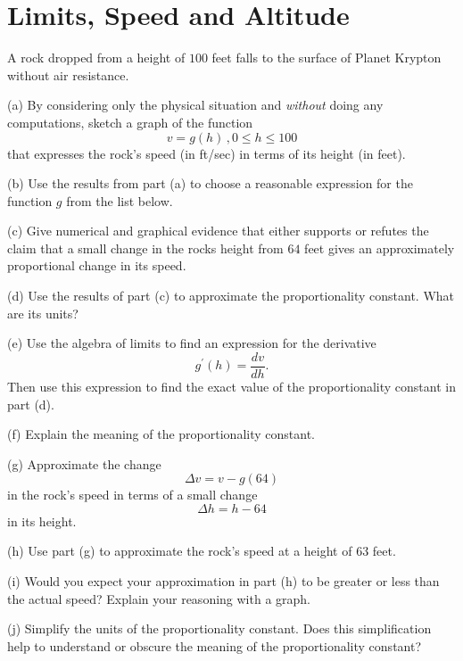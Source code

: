 \documentclass{ximera}
\begin{document}
\section{Limits, Speed and Altitude}
\begin{question}  \label{Ex:defdftd}
A rock dropped from a height of $100$ feet falls to the surface of Planet Krypton without air resistance.

(a) By considering only the physical situation and \emph{without} doing any computations, sketch a graph of the function
\[
    v =g(h) \, , 0\leq h \leq 100
\]
that expresses the rock's speed (in ft/sec) in terms of its height (in feet).

(b) Use the results from part (a) to choose a reasonable expression for the function $g$ from the list below.

\begin{multipleChoice}
\end{multipleChoice}


(c)  Give numerical  and graphical evidence that either supports or refutes the claim that a small change in the rocks height from $64$ feet gives an approximately proportional change in its speed.
  
(d) Use the results of part (c) to approximate the proportionality constant. What are its units?

(e) Use the algebra of limits to find an expression for the derivative
\[
     g^\prime(h) = \frac{dv}{dh} .
\]
Then use this expression to find the exact value of the proportionality constant in part (d).

(f) Explain the meaning of the proportionality constant.

(g) Approximate the change
\[
    \Delta v = v - g(64)
\]
in the rock's speed in terms of a small change
\[
  \Delta h = h - 64
\]
in its height.

(h) Use part (g) to approximate the rock's speed at a height of $63$ feet.

(i) Would you expect your approximation in part (h) to be greater or less than the actual speed? Explain your reasoning with a graph.

(j) Simplify the units of the proportionality constant. Does this simplification help to understand or obscure the meaning of the proportionality constant?
\end{question}
\end{document}
